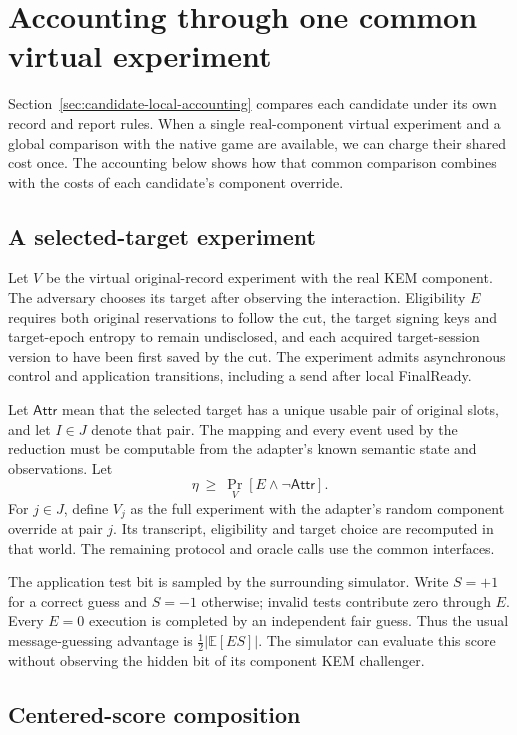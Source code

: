 \section{Accounting through one common virtual experiment}
\label{app:common-virtual}

Section~\ref{sec:candidate-local-accounting} compares each candidate
under its own record and report rules. When a single real-component
virtual experiment and a global comparison with the native game are
available, we can charge their shared cost once. The accounting below
shows how that common comparison combines with the costs of each
candidate's component override.

\subsection{A selected-target experiment}

Let $V$ be the virtual original-record experiment with the real KEM component.
The adversary chooses its target after observing the interaction.
Eligibility $E$ requires both original reservations to follow the cut,
the target signing keys and target-epoch entropy to remain undisclosed,
and each acquired target-session version to have been first saved by
the cut. The experiment admits asynchronous control and application
transitions, including a send after local FinalReady.

Let $\mathsf{Attr}$ mean that the selected target has a unique usable pair of
original slots, and let $I\in J$ denote that pair. The mapping and every event
used by the reduction must be computable from the adapter's known semantic
state and observations. Let
\[
 \eta\ \geq\ \Pr_V[E\wedge\neg\mathsf{Attr}].
\]
For $j\in J$, define $V_j$ as the full experiment with the adapter's random
component override at pair $j$. Its transcript, eligibility and target choice
are recomputed in that world. The remaining protocol and oracle calls use
the common interfaces.

The application test bit is sampled by the surrounding simulator. Write
$S=+1$ for a correct guess and $S=-1$ otherwise; invalid tests contribute zero
through $E$. Every $E=0$ execution is completed by an independent fair guess.
Thus the usual message-guessing advantage is
$\tfrac12|\mathbb E[E S]|$.
The simulator can evaluate this score without observing the hidden bit of its
component KEM challenger.

\subsection{Centered-score composition}

